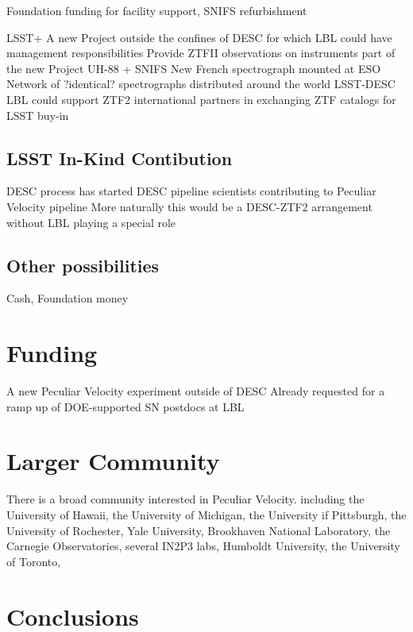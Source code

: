 \documentclass[11pt, oneside]{article}   	%
\begin{document}
Foundation funding for facility support, SNIFS refurbishment





LSST+
A new Project outside the confines of DESC for which LBL could have management responsibilities
Provide ZTFII observations on instruments part of the new Project
UH-88 + SNIFS
New French spectrograph mounted at ESO
Network of ?identical? spectrographs distributed around the world
LSST-DESC
LBL could support ZTF2 international partners in exchanging ZTF catalogs for LSST buy-in

\subsection{LSST In-Kind Contibution}
DESC process has started
DESC pipeline scientists contributing to Peculiar Velocity pipeline
More naturally this would be a DESC-ZTF2 arrangement without LBL playing a special role



\subsection{Other possibilities}
Cash, Foundation money

\section{Funding}
A new Peculiar Velocity experiment outside of DESC
Already requested for a ramp up of DOE-supported SN postdocs at LBL

\section{Larger Community}
There is a broad community interested in Peculiar Velocity. 
including the  University of Hawaii, the University of Michigan, the University if Pittsburgh, the University of Rochester, Yale University,  Brookhaven National Laboratory,
the Carnegie Observatories, several IN2P3 labs, Humboldt University, the University of Toronto, 

\section{Conclusions}
\end{document}
